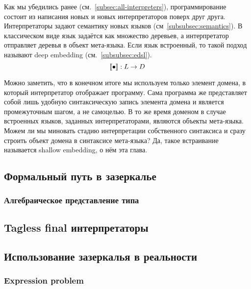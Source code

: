 
Как мы убедились ранее (см.~\ref{subsec:all-interpreters}), программирование состоит из написания новых и новых интерпретаторов поверх друг друга.
Интерпретаторы задают семантику новых языков (см~\ref{subsubsec:semantics}).
В классическом виде язык задаётся как множество деревьев, а интерпретатор отправляет деревья в объект мета-языка.
Если язык встроенный, то такой подход называют deep embedding (см.~\ref{subsubsec:edsl}).
\[
    \llbracket{\bullet}\rrbracket : L \to D
\]

Можно заметить, что в конечном итоге мы используем только элемент домена, в который интерпретатор отображает программу.
Сама программа же представляет собой лишь удобную синтаксическую запись элемента домена и является промежуточным шагом, а не самоцелью.
В то же время доменом в случае встроенных языков, заданных интерпретаторами, являются объекты мета-языка.
Можем ли мы миновать стадию интерпретации собственного синтаксиса и сразу строить объект домена в синтаксисе мета-языка?
Да, такое встраивание называется shallow embedding, о нём эта глава.

\subsection{Формальный путь в зазеркалье}

\subsubsection{Алгебраическое представление типа}



\cite[глава 1]{maguire-types}


\subsection{Tagless final интерпретаторы}


\subsection{Использование зазеркалья в реальности}

\subsubsection{Expression problem}

